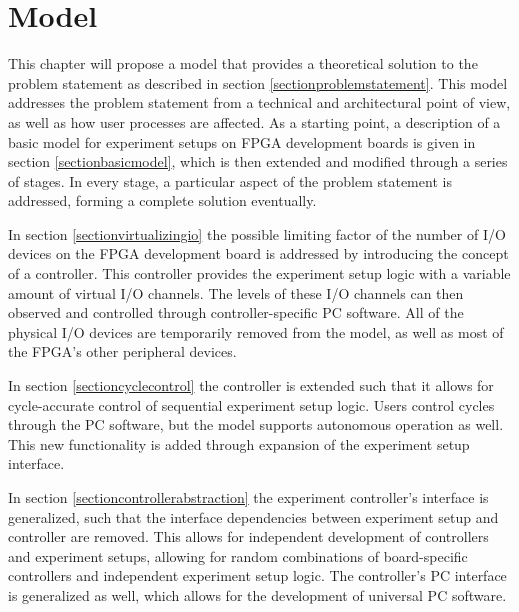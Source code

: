 \documentclass[openright]{template/uva-bachelor-thesis}
\begin{document}
% 
% 

\chapter{Model}



This chapter will propose a model that provides a theoretical solution to the problem statement as described in section \ref{sectionproblemstatement}. This model addresses the problem statement from a technical and architectural point of view, as well as how user processes are affected. As a starting point, a description of a basic model for experiment setups on FPGA development boards is given in section \ref{sectionbasicmodel}, which is then extended and modified through a series of stages. In every stage, a particular aspect of the problem statement is addressed, forming a complete solution eventually. 

In section \ref{sectionvirtualizingio} the possible limiting factor of the  number of I/O devices on the FPGA development board is addressed by introducing the concept of a controller. This controller provides the experiment setup logic with a variable amount of virtual I/O channels. The levels of these I/O channels can then observed and controlled through controller-specific PC software. All of the physical I/O devices are temporarily removed from the model, as well as most of the FPGA's other peripheral devices.

In section \ref{sectioncyclecontrol} the controller is extended such that it allows for cycle-accurate control of sequential experiment setup logic. Users control cycles through the PC software, but the model supports autonomous operation as well. This new functionality is added through expansion of the experiment setup interface.

In section \ref{sectioncontrollerabstraction} the experiment controller's interface is generalized, such that the interface dependencies between experiment setup and controller are removed. This allows for independent development of controllers and experiment setups, allowing for random combinations of board-specific controllers and independent experiment setup logic. The controller's PC interface is generalized as well, which allows for the development of universal PC software.
\end{document}

